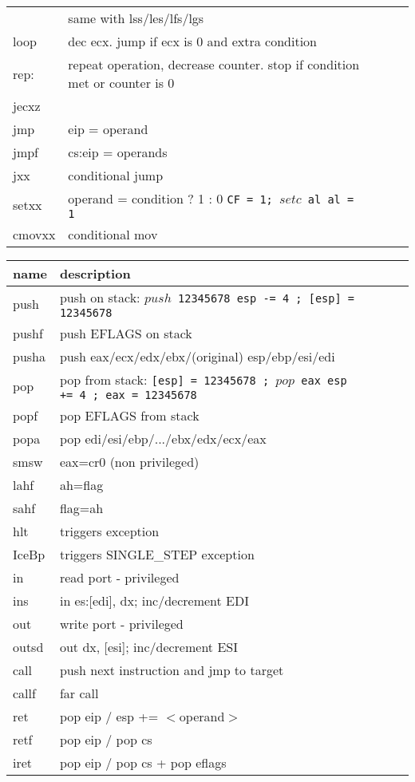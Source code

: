 \begin{tabular}{lllll}
& same with lss/les/lfs/lgs\\
loop 	& dec ecx. jump if ecx is 0 and extra condition\\
rep: 	& repeat operation, decrease counter. stop if condition met or counter is 0\\
jecxz 	& \\
jmp 	& eip = operand\\
jmpf 	& cs:eip = operands\\
jxx 	& conditional jump\\
setxx 	& operand = condition ? 1 : 0 {\tt CF = 1; $setc$ al \ra al = 1}\\
cmovxx & conditional mov \\
\bottomrule
\end{tabular}
\newpage
\begin{tabular}{lllll}
\toprule
name & description \\
\midrule
push 	& push on stack: {\tt $push$ 12345678 \ra esp -= 4 ; [esp] = 12345678}\\
pushf	& push EFLAGS on stack\\
pusha & push eax/ecx/edx/ebx/(original) esp/ebp/esi/edi\\
pop 	& pop from stack: {\tt [esp] = 12345678 ; $pop$ eax \ra esp += 4 ; eax = 12345678}\\
popf	& pop EFLAGS from stack\\
popa & pop edi/esi/ebp/.../ebx/edx/ecx/eax\\
\midrule
smsw & eax=cr0 (non privileged)\\
lahf & ah=flag  \\ 
sahf & flag=ah \\
\midrule
hlt & triggers exception \\
IceBp & triggers SINGLE\_STEP exception\\
\midrule
in & read port - privileged\\
ins & in es:[edi], dx; inc/decrement EDI \\
out & write port - privileged\\
outsd & out dx, [esi]; inc/decrement ESI\\
\midrule
call & push next instruction and jmp to target\\
callf & far call \\
ret & pop eip / esp += $<$operand$>$\\
retf & pop eip / pop cs\\
iret & pop eip / pop cs + pop eflags\\

\end{tabular}
